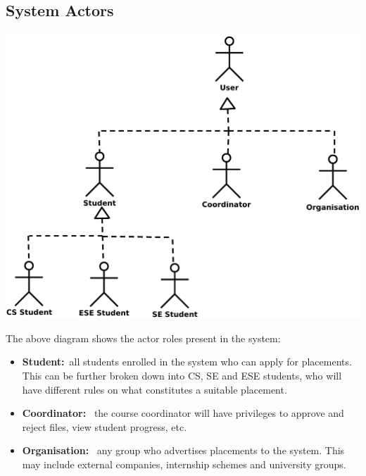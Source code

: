 \documentclass{l3deliverable}
\begin{document}
\subsection{System Actors}
\includegraphics[scale = 0.5]{Actors.pdf}

The above diagram shows the actor roles present in the system:
\begin{itemize}
\item{\textbf{Student:}\ all students enrolled in the system who can apply for placements. This can be further broken down into CS, SE and ESE students, who will have
different rules on what constitutes a suitable placement.}
\item{\textbf{Coordinator: }\ the course coordinator will have privileges to approve and reject files, view student progress, etc.}
\item{\textbf{Organisation: }\ any group who advertises placements to the system. This may include external companies, internship schemes and university groups.}
\end{itemize}
\end{document}
